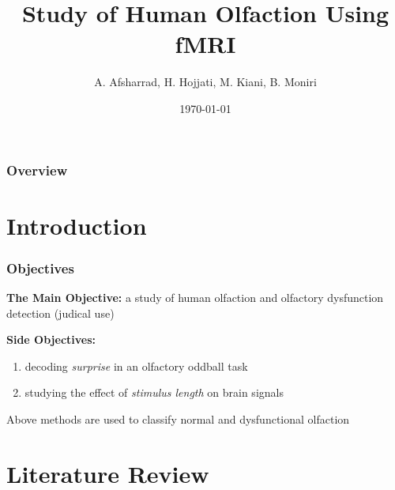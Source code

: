 \documentclass{beamer}
\title[Hmuan Olfaction]{Study of Human Olfaction Using fMRI} %
\author{A. Afsharrad, H. Hojjati, M. Kiani, B. Moniri} %
\institute[Sharif University of Technology] %
{
Ambient Intelligence Research Lab (AIR Lab)\\ \textbf{Sharif University of Technology} \\ 
\medskip
}
\date{\today} %
\begin{document}
\begin{frame}
\titlepage %
\end{frame}

\begin{frame}
\frametitle{Overview} %
\tableofcontents %
\end{frame}


\section{Introduction} 

\begin{frame}
\frametitle{Objectives}
\textbf{The Main Objective:}
a study of human olfaction and olfactory dysfunction detection (judical use)
\\
\vspace{0.5cm}

\textbf{Side Objectives:}
\begin{enumerate}
	\item
	decoding \emph{surprise} in an olfactory oddball task
	\item
	studying the effect of \emph{stimulus length} on brain signals
\end{enumerate}
Above methods are used to classify normal and dysfunctional olfaction
\end{frame}


\section{Literature Review} 
\end{document}
